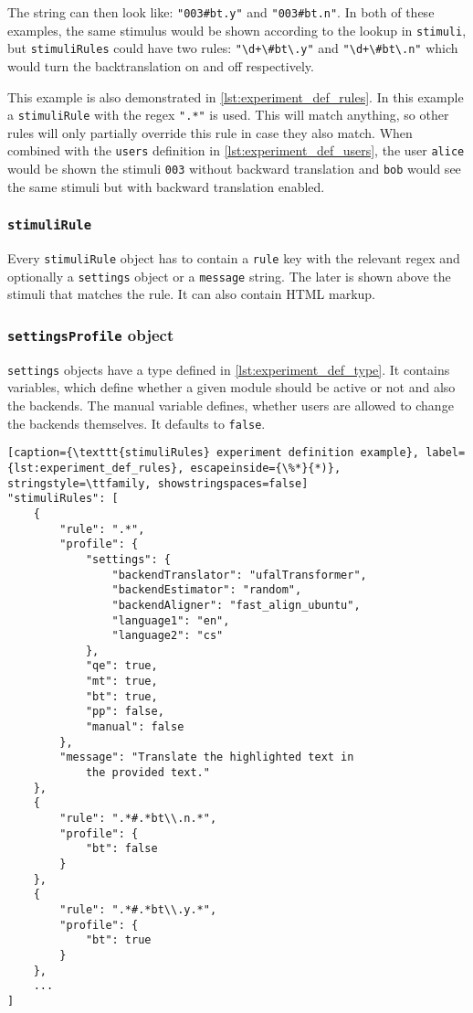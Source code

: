 The string can then look like: \texttt{"003\#bt.y"} and \texttt{"003\#bt.n"}. In both of these examples, the same stimulus would be shown according to the lookup in \texttt{stimuli}, but \texttt{stimuliRules} could have two rules: \texttt{"\textbackslash d+\textbackslash \#bt\textbackslash.y"} and \texttt{"\textbackslash d+\textbackslash\#bt\textbackslash.n"} which would turn the backtranslation on and off respectively.

This example is also demonstrated in \cref{lst:experiment_def_rules}. In this example a \texttt{stimuliRule} with the regex \texttt{".*"} is used. This will match anything, so other rules will only partially override this rule in case they also match. When combined with the \texttt{users} definition in \cref{lst:experiment_def_users}, the user \texttt{alice} would be shown the stimuli \texttt{003} without backward translation and \texttt{bob} would see the same stimuli but with backward translation enabled.

\subsubsection*{\texttt{stimuliRule}}

Every \texttt{stimuliRule} object has to contain a \texttt{rule} key with the relevant regex and optionally a \texttt{settings} object or a \texttt{message} string. The later is shown above the stimuli that matches the rule. It can also contain HTML markup.

\subsubsection*{\texttt{settingsProfile} object}

\texttt{settings} objects have a type defined in \cref{lst:experiment_def_type}. It contains variables, which define whether a given module should be active or not and also the backends. The manual variable defines, whether users are allowed to change the backends themselves. It defaults to \texttt{false}.

\pagebreak
\begin{lstlisting}[caption={\texttt{stimuliRules} experiment definition example}, label={lst:experiment_def_rules}, escapeinside={\%*}{*)}, stringstyle=\ttfamily, showstringspaces=false]
"stimuliRules": [
    {
        "rule": ".*",
        "profile": {
            "settings": {
                "backendTranslator": "ufalTransformer",
                "backendEstimator": "random",
                "backendAligner": "fast_align_ubuntu",
                "language1": "en",
                "language2": "cs"
            },
            "qe": true,
            "mt": true,
            "bt": true,
            "pp": false,
            "manual": false
        },
        "message": "Translate the highlighted text in
            the provided text."
    },
    {
        "rule": ".*#.*bt\\.n.*",
        "profile": {
            "bt": false
        }
    },
    {
        "rule": ".*#.*bt\\.y.*",
        "profile": {
            "bt": true
        }
    },
    ...
]
\end{lstlisting}

